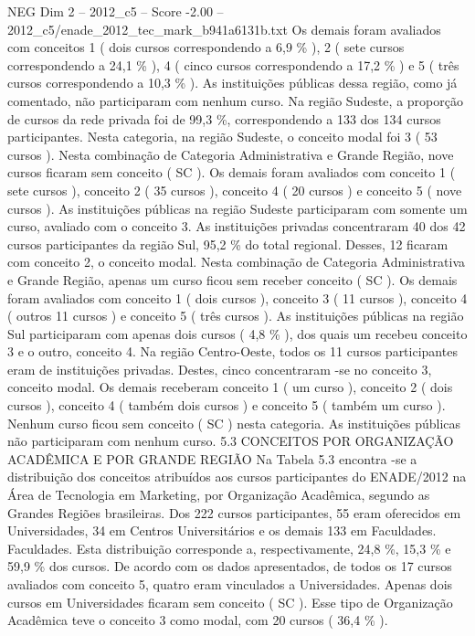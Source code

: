 \begin{textsample}{NEG Dim 2 – 2012\_c5 – Score -2.00 – 2012\_c5/enade\_2012\_tec\_mark\_b941a6131b.txt}
Os demais foram avaliados com conceitos 1 ( dois cursos correspondendo a 6,9 \% ), 2 ( sete cursos correspondendo a 24,1 \% ), 4 ( cinco cursos correspondendo a 17,2 \% ) e 5 ( três cursos correspondendo a 10,3 \% ).
As instituições públicas dessa região, como já comentado, não participaram com nenhum curso.
Na região Sudeste, a proporção de cursos da rede privada foi de 99,3 \%, correspondendo a 133 dos 134 cursos participantes.
Nesta categoria, na região Sudeste, o conceito modal foi 3 ( 53 cursos ).
Nesta combinação de Categoria Administrativa e Grande Região, nove cursos ficaram sem conceito ( SC ).
Os demais foram avaliados com conceito 1 ( sete cursos ), conceito 2 ( 35 cursos ), conceito 4 ( 20 cursos ) e conceito 5 ( nove cursos ).
As instituições públicas na região Sudeste participaram com somente um curso, avaliado com o conceito 3.
As instituições privadas concentraram 40 dos 42 cursos participantes da região Sul, 95,2 \% do total regional.
Desses, 12 ficaram com conceito 2, o conceito modal.
Nesta combinação de Categoria Administrativa e Grande Região, apenas um curso ficou sem receber conceito ( SC ).
Os demais foram avaliados com conceito 1 ( dois cursos ), conceito 3 ( 11 cursos ), conceito 4 ( outros 11 cursos ) e conceito 5 ( três cursos ).
As instituições públicas na região Sul participaram com apenas dois cursos ( 4,8 \% ), dos quais um recebeu conceito 3 e o outro, conceito 4.
Na região Centro-Oeste, todos os 11 cursos participantes eram de instituições privadas.
Destes, cinco concentraram -se no conceito 3, conceito modal.
Os demais receberam conceito 1 ( um curso ), conceito 2 ( dois cursos ), conceito 4 ( também dois cursos ) e conceito 5 ( também um curso ).
Nenhum curso ficou sem conceito ( SC ) nesta categoria.
As instituições públicas não participaram com nenhum curso. 5.3 CONCEITOS POR ORGANIZAÇÃO ACADÊMICA E POR GRANDE REGIÃO Na Tabela 5.3 encontra -se a distribuição dos conceitos atribuídos aos cursos participantes do ENADE/2012 na Área de Tecnologia em Marketing, por Organização Acadêmica, segundo as Grandes Regiões brasileiras.
Dos 222 cursos participantes, 55 eram oferecidos em Universidades, 34 em Centros Universitários e os demais 133 em Faculdades.
Faculdades.
Esta distribuição corresponde a, respectivamente, 24,8 \%, 15,3 \% e 59,9 \% dos cursos.
De acordo com os dados apresentados, de todos os 17 cursos avaliados com conceito 5, quatro eram vinculados a Universidades.
Apenas dois cursos em Universidades ficaram sem conceito ( SC ).
Esse tipo de Organização Acadêmica teve o conceito 3 como modal, com 20 cursos ( 36,4 \% ).

\end{textsample}
